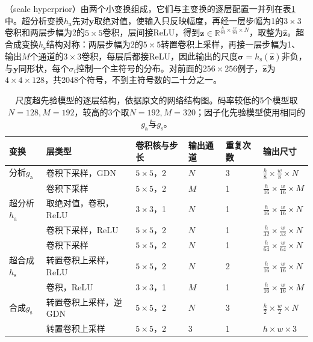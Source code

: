 （scale hyperprior）由两个小变换组成，它们与主变换的逐层配置一并列在表\ref{tab:vision-hyperprior-layers}中。超分析变换$h_{\mathrm{a}}$先对$\bm{y}$取绝对值，使输入只反映幅度，再经一层步幅为1的$3\times3$卷积和两层步幅为2的$5\times5$卷积，层间接ReLU，得到$\bm{z}\in\mathbb{R}^{\frac{h}{64}\times\frac{w}{64}\times N}$，取整为$\hat{\bm{z}}$。超合成变换$h_{\mathrm{s}}$结构对称：两层步幅为2的$5\times5$转置卷积上采样，再接一层步幅为1、输出$M$个通道的$3\times3$卷积，每层后都接ReLU，因此输出的尺度$\bm{\sigma}=h_{\mathrm{s}}(\hat{\bm{z}})$非负，与$\bm{y}$同形状，每个$\sigma_i$控制一个主符号的分布。对前面的$256\times256$例子，$\hat{\bm{z}}$为$4\times4\times128$，共2048个符号，不到主符号数的二十分之一。

\begin{table}[tbp]
 \centering
 \small
 \begin{tabularx}{\linewidth}{@{}p{22mm}Xp{24mm}p{12mm}p{12mm}p{26mm}@{}}
  \toprule
  变换 & 层类型 & 卷积核与步长 & 输出通道 & 重复次数 & 输出尺寸\\
  \midrule
  分析$g_{\mathrm{a}}$ & 卷积下采样，GDN & $5\times5$，2 & $N$ & 3 & $\frac h8\times\frac w8\times N$\\
   & 卷积下采样 & $5\times5$，2 & $M$ & 1 & $\frac h{16}\times\frac w{16}\times M$\\
  超分析$h_{\mathrm{a}}$ & 取绝对值，卷积，ReLU & $3\times3$，1 & $N$ & 1 & $\frac h{16}\times\frac w{16}\times N$\\
   & 卷积下采样，ReLU & $5\times5$，2 & $N$ & 1 & $\frac h{32}\times\frac w{32}\times N$\\
   & 卷积下采样 & $5\times5$，2 & $N$ & 1 & $\frac h{64}\times\frac w{64}\times N$\\
  超合成$h_{\mathrm{s}}$ & 转置卷积上采样，ReLU & $5\times5$，2 & $N$ & 2 & $\frac h{16}\times\frac w{16}\times N$\\
   & 卷积，ReLU & $3\times3$，1 & $M$ & 1 & $\frac h{16}\times\frac w{16}\times M$\\
  合成$g_{\mathrm{s}}$ & 转置卷积上采样，逆GDN & $5\times5$，2 & $N$ & 3 & $\frac h2\times\frac w2\times N$\\
   & 转置卷积上采样 & $5\times5$，2 & 3 & 1 & $h\times w\times3$\\
  \bottomrule
 \end{tabularx}
 \caption{尺度超先验模型的逐层结构，依据原文的网络结构图。码率较低的5个模型取$N=128,M=192$，较高的3个取$N=192,M=320$；因子化先验模型使用相同的$g_{\mathrm{a}}$与$g_{\mathrm{s}}$。}
 \label{tab:vision-hyperprior-layers}
\end{table}

